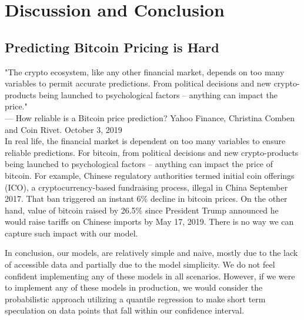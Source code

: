 \documentclass[9pt,twocolumn,twoside]{ilcss}
\begin{document}
\section{Discussion and Conclusion}
\subsection*{Predicting Bitcoin Pricing is Hard}
"The crypto ecosystem, like any other financial market, depends on too many variables to permit accurate predictions. From political decisions and new crypto-products being launched to psychological factors – anything can impact the price."
\\[3pt]
--- How reliable is a Bitcoin price prediction? Yahoo Finance, Christina Comben and Coin Rivet. October 3, 2019
\\[3pt]

In real life, the financial market is dependent on too many variables to ensure reliable predictions. For bitcoin, from political decisions and new crypto-products being launched to psychological factors – anything can impact the price of bitcoin. For example, Chinese regulatory authorities termed initial coin offerings (ICO), a cryptocurrency-based fundraising process, illegal in China September 2017. That ban triggered an instant 6\% decline in bitcoin prices. On the other hand, value of bitcoin raised by 26.5\% since President Trump announced he would raise tariffs on Chinese imports by May 17, 2019. There is no way we can capture such impact with our model. 

In conclusion, our models, are relatively simple and naive, mostly due to the lack of accessible data and partially due to the model simplicity. We do not feel confident implementing any of these models in all scenarios. However, if we were to implement any of these models in production, we would consider the probabilistic approach utilizing a quantile regression to make short term speculation on data points that fall within our confidence interval.
\end{document}

